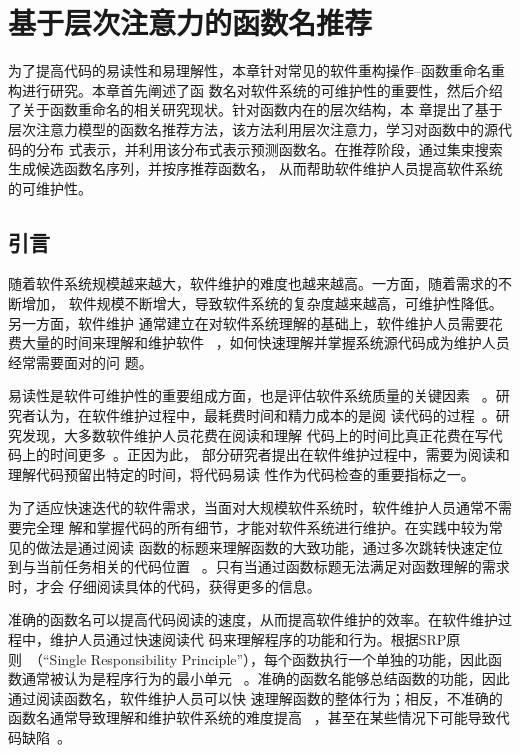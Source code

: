 
\chapter{基于层次注意力的函数名推荐}
为了提高代码的易读性和易理解性，本章针对常见的软件重构操作--函数重命名重构进行研究。本章首先阐述了函
数名对软件系统的可维护性的重要性，然后介绍了关于函数重命名的相关研究现状。针对函数内在的层次结构，本
章提出了基于层次注意力模型的函数名推荐方法，该方法利用层次注意力，学习对函数中的源代码的分布
式表示，并利用该分布式表示预测函数名。在推荐阶段，通过集束搜索生成候选函数名序列，并按序推荐函数名，
从而帮助软件维护人员提高软件系统的可维护性。

\section{引言}
随着软件系统规模越来越大，软件维护的难度也越来越高。一方面，随着需求的不断增加，
软件规模不断增大，导致软件系统的复杂度越来越高，可维护性降低。另一方面，软件维护
通常建立在对软件系统理解的基础上，软件维护人员需要花费大量的时间来理解和维护软件
~\cite{Bansiya2002}，如何快速理解并掌握系统源代码成为维护人员经常需要面对的问
题。

易读性是软件可维护性的重要组成方面，也是评估软件系统质量的关键因素
~\cite{buse2008metric}。研究者认为，在软件维护过程中，最耗费时间和精力成本的是阅
读代码的过程~\cite{rugaber2000use}。研究发现，大多数软件维护人员花费在阅读和理解
代码上的时间比真正花费在写代码上的时间更多~\cite{ko2006exploratory}。正因为此，
部分研究者提出在软件维护过程中，需要为阅读和理解代码预留出特定的时间，将代码易读
性作为代码检查的重要指标之一。

为了适应快速迭代的软件需求，当面对大规模软件系统时，软件维护人员通常不需要完全理
解和掌握代码的所有细节，才能对软件系统进行维护。在实践中较为常见的做法是通过阅读
函数的标题来理解函数的大致功能，通过多次跳转快速定位到与当前任务相关的代码位置
~\cite{starke2009searching}。只有当通过函数标题无法满足对函数理解的需求时，才会
仔细阅读具体的代码，获得更多的信息。

准确的函数名可以提高代码阅读的速度，从而提高软件维护的效率。在软件维护过程中，维护人员通过快速阅读代
码来理解程序的功能和行为。根据SRP原则~\cite{martin2003agile}（``Single Responsibility
Principle''），每个函数执行一个单独的功能，因此函数通常被认为是程序行为的最小单元
~\cite{host2009debugging}。准确的函数名能够总结函数的功能，因此通过阅读函数名，软件维护人员可以快
速理解函数的整体行为；相反，不准确的函数名通常导致理解和维护软件系统的难度提高
~\cite{arnaoudova2016linguistic}，甚至在某些情况下可能导致代码缺陷~\cite{abebe2012can}。

